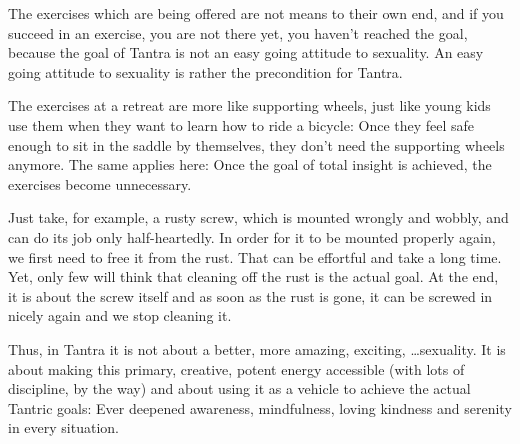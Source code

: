 The exercises which are being offered are not means to their own end, and if you succeed in an exercise, you are not there yet, you haven’t reached the goal, because the goal of Tantra is not an easy going attitude to sexuality. An easy going attitude to sexuality is rather the precondition for Tantra.

The exercises at a retreat are more like supporting wheels, just like young kids use them when they want to learn how to ride a bicycle: Once they feel safe enough to sit in the saddle by themselves, they don't need the supporting wheels anymore. The same applies here: Once the goal of total insight is achieved, the exercises become unnecessary.

Just take, for example, a rusty screw, which is mounted wrongly and wobbly, and can do its job only half-heartedly. In order for it to be mounted properly again, we first need to free it from the rust. That can be effortful and take a long time. Yet, only few will think that cleaning off the rust is the actual goal. At the end, it is about the screw itself and as soon as the rust is gone, it can be screwed in nicely again and we stop cleaning it.

Thus, in Tantra it is not about a better, more amazing, exciting, \ldots sexuality. It is about making this primary, creative, potent energy accessible (with lots of discipline, by the way) and about using it as a vehicle to achieve the actual Tantric goals: Ever deepened awareness, mindfulness, loving kindness and serenity in every situation.
